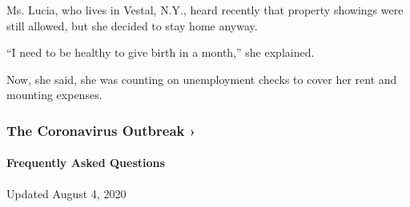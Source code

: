 Ms. Lucia, who lives in Vestal, N.Y., heard recently that property
showings were still allowed, but she decided to stay home anyway.

``I need to be healthy to give birth in a month,'' she explained.

Now, she said, she was counting on unemployment checks to cover her rent
and mounting expenses.

\href{https://www.nytimes.com/news-event/coronavirus?action=click\&pgtype=Article\&state=default\&region=MAIN_CONTENT_3\&context=storylines_faq}{}

\hypertarget{the-coronavirus-outbreak-}{%
\subsubsection{The Coronavirus Outbreak
›}\label{the-coronavirus-outbreak-}}

\hypertarget{frequently-asked-questions}{%
\paragraph{Frequently Asked
Questions}\label{frequently-asked-questions}}

Updated August 4, 2020

